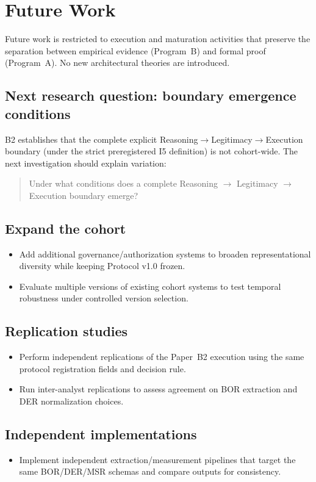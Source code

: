 \section{Future Work}
\label{sec:future-work}
Future work is restricted to execution and maturation activities that preserve the separation between empirical evidence (Program~B) and formal proof (Program~A). No new architectural theories are introduced.

\subsection{Next research question: boundary emergence conditions}
B2 establishes that the complete explicit Reasoning$\rightarrow$Legitimacy$\rightarrow$Execution boundary (under the strict preregistered I5 definition) is not cohort-wide. The next investigation should explain variation:
\begin{quote}
Under what conditions does a complete Reasoning $\rightarrow$ Legitimacy $\rightarrow$ Execution boundary emerge?
\end{quote}

\subsection{Expand the cohort}
\begin{itemize}
  \item Add additional governance/authorization systems to broaden representational diversity while keeping Protocol v1.0 frozen.
  \item Evaluate multiple versions of existing cohort systems to test temporal robustness under controlled version selection.
\end{itemize}

\subsection{Replication studies}
\begin{itemize}
  \item Perform independent replications of the Paper~B2 execution using the same protocol registration fields and decision rule.
  \item Run inter-analyst replications to assess agreement on BOR extraction and DER normalization choices.
\end{itemize}

\subsection{Independent implementations}
\begin{itemize}
  \item Implement independent extraction/measurement pipelines that target the same BOR/DER/MSR schemas and compare outputs for consistency.
\end{itemize}

